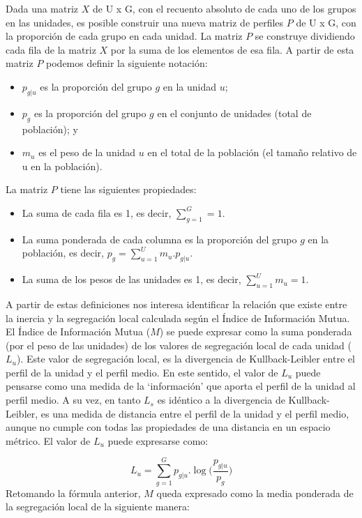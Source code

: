 \documentclass[
  spanish,
  a4paper,%
  chapterprefix=true,%
  DIV=calc,%
  twoside]{scrbook}%
\providecommand{\tightlist}{%
  \setlength{\itemsep}{0pt}\setlength{\parskip}{0pt}}
\begin{document}
Dada una matriz \(X\) de U x G, con el recuento absoluto de cada uno de los grupos en las unidades, es posible construir una nueva matriz de perfiles \(P\) de U x G, con la proporción de cada grupo en cada unidad. La matriz \(P\) se construye dividiendo cada fila de la matriz \(X\) por la suma de los elementos de esa fila. A partir de esta matriz \(P\) podemos definir la siguiente notación:

\begin{itemize}
\item
  \(p_{g|u}\) es la proporción del grupo \(g\) en la unidad \(u\);
\item
  \(p_{g}\) es la proporción del grupo \(g\) en el conjunto de unidades (total de población); y
\item
  \(m_u\) es el peso de la unidad \(u\) en el total de la población (el tamaño relativo de u en la población).
\end{itemize}

La matriz \(P\) tiene las siguientes propiedades:

\begin{itemize}
\tightlist
\item
  La suma de cada fila es 1, es decir, \(\sum_{g=1}^G = 1\).
\item
  La suma ponderada de cada columna es la proporción del grupo \(g\) en la población, es decir, \(p_{g} = \sum_{u=1}^U m_u . p_{g|u}\).
\item
  La suma de los pesos de las unidades es 1, es decir, \(\sum_{u=1}^U m_u = 1\).
\end{itemize}

A partir de estas definiciones nos interesa identificar la relación que existe entre la inercia y la segregación local calculada según el Índice de Información Mutua. El Índice de Información Mutua (\(M\)) se puede expresar como la suma ponderada (por el peso de las unidades) de los valores de segregación local de cada unidad (\(L_u\)). Este valor de segregación local, es la divergencia de Kullback-Leibler entre el perfil de la unidad y el perfil medio. En este sentido, el valor de \(L_u\) puede pensarse como una medida de la `información' que aporta el perfil de la unidad al perfil medio. A su vez, en tanto \(L_s\) es idéntico a la divergencia de Kullback-Leibler, es una medida de distancia entre el perfil de la unidad y el perfil medio, aunque no cumple con todas las propiedades de una distancia en un espacio métrico. El valor de \(L_u\) puede expresarse como:

\[
L_u = \sum_{g=1}^G p_{g|u}.\log({\frac{p_{g|u}}{p_{g}})}
\] Retomando la fórmula anterior, \(M\) queda expresado como la media ponderada de la segregación local de la siguiente manera:
\end{document}
